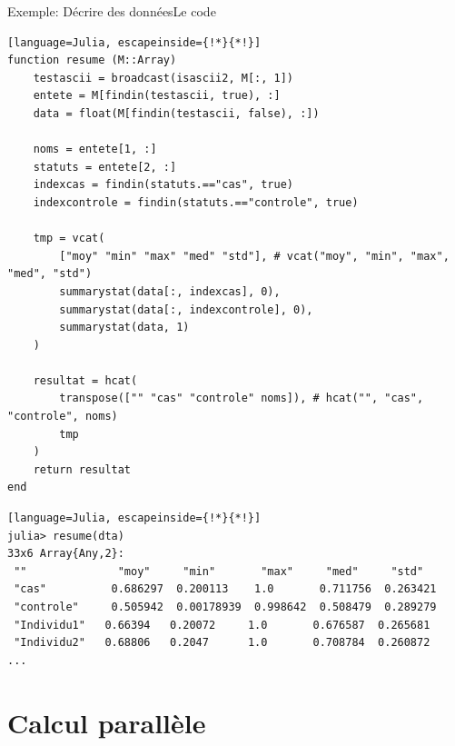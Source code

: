 \begin{frame}[containsverbatim]{\textcolor{goldenrod2}{Exemple:} Décrire des données}{Le code}
\vspace{-1ex}
\begin{lstlisting}[language=Julia, escapeinside={!*}{*!}]
function resume (M::Array)
    testascii = broadcast(isascii2, M[:, 1])
    entete = M[findin(testascii, true), :]
    data = float(M[findin(testascii, false), :])

    noms = entete[1, :]
    statuts = entete[2, :]
    indexcas = findin(statuts.=="cas", true)
    indexcontrole = findin(statuts.=="controle", true)

    tmp = vcat(
        ["moy" "min" "max" "med" "std"], # vcat("moy", "min", "max", "med", "std")
        summarystat(data[:, indexcas], 0),
        summarystat(data[:, indexcontrole], 0),
        summarystat(data, 1)
    )

    resultat = hcat(
        transpose(["" "cas" "controle" noms]), # hcat("", "cas", "controle", noms)
        tmp
    )
    return resultat
end
\end{lstlisting}
\vspace{-3ex}
\begin{lstlisting}[language=Julia, escapeinside={!*}{*!}]
julia> resume(dta)
33x6 Array{Any,2}:
 ""              "moy"     "min"       "max"     "med"     "std"
 "cas"          0.686297  0.200113    1.0       0.711756  0.263421
 "controle"     0.505942  0.00178939  0.998642  0.508479  0.289279
 "Individu1"   0.66394   0.20072     1.0       0.676587  0.265681
 "Individu2"   0.68806   0.2047      1.0       0.708784  0.260872
...
\end{lstlisting}
\end{frame}


\section{Calcul parallèle}
